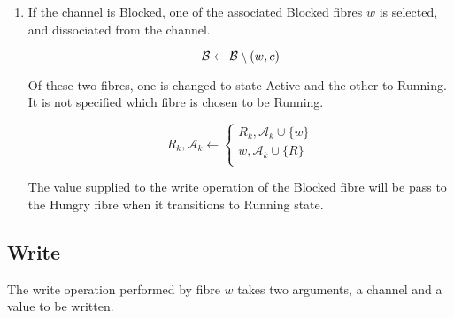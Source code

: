 \documentclass[oneside]{book}
\begin{document}
\begin{enumerate}
\item If the channel is Blocked, one of the associated Blocked fibres $w$
is selected, and dissociated from the channel. 

\begin{equation}
{\mathcal B} \leftarrow {\mathcal B}\setminus (w,c)\\ 
\end{equation}

Of these two
fibres, one is changed to state Active and the other to Running.
It is not specified which fibre is chosen to be Running.

\begin{equation}
R_k,{\mathcal A_k} \leftarrow
\begin{cases}
R_k,{\mathcal A_k} \cup \{w\} \\
w,{\mathcal A_k} \cup \{R\} \\
\end{cases}
\end{equation}

The value supplied to the write operation of the Blocked
fibre will be pass to the Hungry fibre when it transitions
to Running state.


\end{enumerate}



\subsection{Write}
The write operation performed by fibre $w$ takes two arguments, a channel and a value
to be written.
\end{document}
